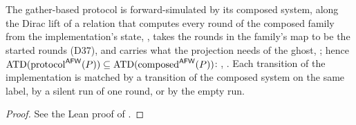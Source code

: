 \begin{theorem}
  \label{thm:aba-afw-protocol-composed}
  \leanok
  The gather-based protocol is forward-simulated by its composed system, along the Dirac lift of a relation that computes every round of the composed family from the implementation's state, , takes the rounds in the family's map to be the started rounds (D37), and carries what the projection needs of the ghost, ; hence $\operatorname{ATD}(\mathrm{protocol}^{\mathsf{AFW}}(P)) \subseteq \operatorname{ATD}(\mathrm{composed}^{\mathsf{AFW}}(P))$: , .
  Each transition of the implementation is matched by a transition of the composed system on the same label, by a silent run of one round, or by the empty run.
\end{theorem}

\begin{proof}\leanok
  See the Lean proof of .
\end{proof}
